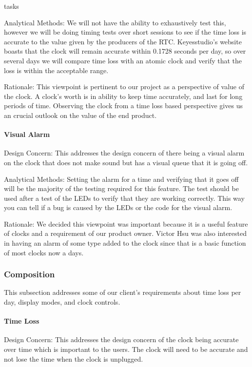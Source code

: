 tasks\documentclass[onecolumn, draftclsnofoot,10pt, compsoc]{IEEEtran}
\begin{document}
\vspace{2mm} Analytical Methods: We will not have the ability to exhaustively test this, however we will be doing timing tests over short sessions to see if the time loss is accurate to the value given by the producers of the RTC.
Keyesstudio's website boasts that the clock will remain accurate within 0.1728 seconds per day, so over several days we will compare time loss with an atomic clock  and verify that the loss is within the acceptable range.

\vspace{2mm} Rationale: This viewpoint is pertinent to our project as a perspective of value of the clock.
A clock's worth is in ability to keep time accurately, and last for long periods of time.
Observing the clock from a time loss based perspective gives us an crucial outlook on the value of the end product.

\paragraph{Visual Alarm}
\vspace{2mm} Design Concern: This addresses the design concern of there being a visual alarm on the clock that does not make sound but has a visual queue that it is going off.

\vspace{2mm} Analytical Methods: Setting the alarm for a time and verifying that it goes off will be the majority of the testing required for this feature.
The test should be used after a test of the LEDs to verify that they are working correctly.
This way you can tell if a bug is caused by the LEDs or the code for the visual alarm.

\vspace{2mm} Rationale: We decided this viewpoint was important because it is a useful feature of clocks and a requirement of our product owner.
Victor Hsu was also interested in having an alarm of some type added to the clock since that is a basic function of most clocks now a days.

\subsubsection{Composition}
This subsection addresses some of our client's requirements about time loss per day, display modes, and clock controls.

\paragraph{Time Loss}
\vspace{2mm} Design Concern: This addresses the design concern of the clock being accurate over time which is important to the users.
The clock will need to be accurate and not lose the time when the clock is unplugged.
\end{document}
